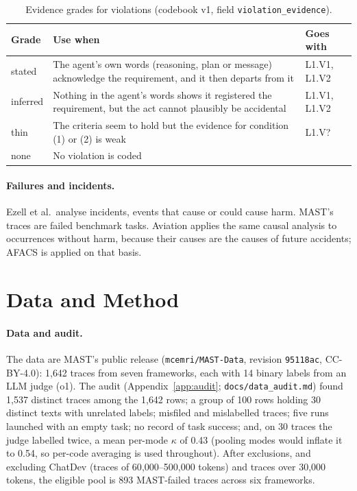 \documentclass[10pt,a4paper]{article}
\newcommand{\code}[1]{\texttt{#1}}
\begin{document}
\begin{table}[tbp]
\centering
\caption{Evidence grades for violations (codebook v1, field \code{violation\_evidence}).}
\label{tab:evidence}
\small
\begin{tabular}{@{}lL{9.8cm}l@{}}
\toprule
Grade & Use when & Goes with\\
\midrule
stated & The agent's own words (reasoning, plan or message) acknowledge the requirement, and it then departs from it & L1.V1, L1.V2\\
inferred & Nothing in the agent's words shows it registered the requirement, but the act cannot plausibly be accidental & L1.V1, L1.V2\\
thin & The criteria seem to hold but the evidence for condition (1) or (2) is weak & L1.V?\\
none & No violation is coded & \\
\bottomrule
\end{tabular}
\end{table}

\paragraph{Failures and incidents.} Ezell et al.\ analyse incidents, events that
cause or could cause harm. MAST's traces are failed benchmark tasks. Aviation
applies the same causal analysis to occurrences without harm, because their
causes are the causes of future accidents; AFACS is applied on that basis.

\section{Data and Method}
\label{sec:method}

\paragraph{Data and audit.}
\label{sec:audit}
The data are MAST's public release (\code{mcemri/MAST-Data}, revision
\code{95118ac}, CC-BY-4.0): 1{,}642 traces from seven frameworks, each with 14
binary labels from an LLM judge (o1). The audit (Appendix~\ref{app:audit};
\code{docs/data\_audit.md}) found 1{,}537 distinct traces among the 1{,}642 rows;
a group of 100 rows holding 30 distinct texts with unrelated labels; misfiled and
mislabelled traces; five runs launched with an empty task; no record of task
success; and, on 30 traces the judge labelled twice, a mean per-mode $\kappa$ of
0.43 (pooling modes would inflate it to 0.54, so per-code averaging is used
throughout). After exclusions, and excluding ChatDev (traces of 60{,}000--500{,}000
tokens) and traces over 30{,}000 tokens, the eligible pool is 893 MAST-failed
traces across six frameworks.
\end{document}
